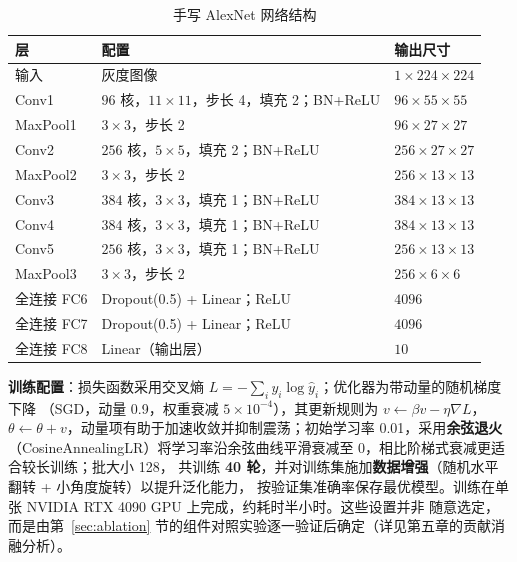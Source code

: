 \documentclass[12pt,a4paper,fontset=fandol]{ctexart}   %
\numberwithin{figure}{section}
\numberwithin{table}{section}
\numberwithin{equation}{section}
\begin{document}
\begin{table}[H]
  \centering
  \caption{手写 AlexNet 网络结构}
  \label{tab:alexnet}
  \begin{tabular}{l l l}
    \toprule
    层 & 配置 & 输出尺寸 \\
    \midrule
    输入        & 灰度图像                                   & $1\times224\times224$ \\
    Conv1       & $96$ 核，$11\times11$，步长 4，填充 2；BN+ReLU & $96\times55\times55$ \\
    MaxPool1    & $3\times3$，步长 2                          & $96\times27\times27$ \\
    Conv2       & $256$ 核，$5\times5$，填充 2；BN+ReLU      & $256\times27\times27$ \\
    MaxPool2    & $3\times3$，步长 2                          & $256\times13\times13$ \\
    Conv3       & $384$ 核，$3\times3$，填充 1；BN+ReLU       & $384\times13\times13$ \\
    Conv4       & $384$ 核，$3\times3$，填充 1；BN+ReLU       & $384\times13\times13$ \\
    Conv5       & $256$ 核，$3\times3$，填充 1；BN+ReLU       & $256\times13\times13$ \\
    MaxPool3    & $3\times3$，步长 2                          & $256\times6\times6$ \\
    全连接 FC6  & Dropout(0.5) + Linear；ReLU                 & $4096$ \\
    全连接 FC7  & Dropout(0.5) + Linear；ReLU                 & $4096$ \\
    全连接 FC8  & Linear（输出层）                            & $10$ \\
    \bottomrule
  \end{tabular}
\end{table}

\textbf{训练配置}：损失函数采用交叉熵 $L=-\sum_{i}y_i\log\hat{y}_i$；优化器为带动量的随机梯度下降
（SGD，动量 0.9，权重衰减 $5\times10^{-4}$），其更新规则为 $v\leftarrow\beta v-\eta\nabla L$，
$\theta\leftarrow\theta+v$，动量项有助于加速收敛并抑制震荡；初始学习率 0.01，采用\textbf{余弦退火}
（CosineAnnealingLR）将学习率沿余弦曲线平滑衰减至 0，相比阶梯式衰减更适合较长训练；批大小 128，
共训练 \textbf{40 轮}，并对训练集施加\textbf{数据增强}（随机水平翻转 + 小角度旋转）以提升泛化能力，
按验证集准确率保存最优模型。训练在单张 NVIDIA RTX 4090 GPU 上完成，约耗时半小时。这些设置并非
随意选定，而是由第~\ref{sec:ablation} 节的组件对照实验逐一验证后确定（详见第五章的贡献消融分析）。
\end{document}
